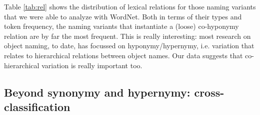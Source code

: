  

Table \ref{tab:rel} shows the distribution of lexical relations for those naming variants that we were able to analyze with WordNet.
Both in terms of their types and token frequency, the naming variants that instantiate a (loose) co-hyponymy relation are by far the most frequent.
This is really interesting: most research on object naming, to date, has focussed on hyponymy/hypernymy, i.e. variation that relates to hierarchical relations between object names.
Our data suggests that co-hierarchical variation is really important too.

\subsection{Beyond synonymy and hypernymy: cross-classification}



